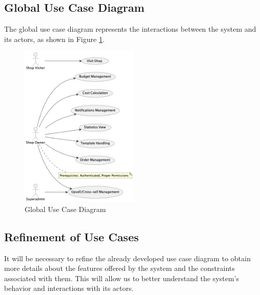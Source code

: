 \subsection{Global Use Case Diagram}
The global use case diagram represents the interactions between the system and its actors, as shown in Figure \ref{fig:use_case_diagram}.
\begin{figure}[H]
  \centering
  \includegraphics[width=0.5\textwidth]{Images/globalUseCase.png}
  \caption{Global Use Case Diagram}
  \label{fig:use_case_diagram}
\end{figure}

\subsection{Refinement of Use Cases}
It will be necessary to refine the already developed use case diagram to obtain more details about the features offered by the system and the constraints associated with them. This will allow us to better understand the system's behavior and interactions with its actors.


